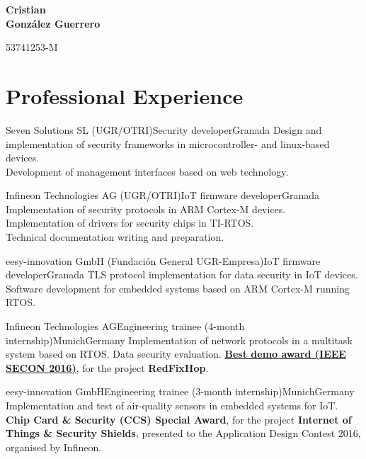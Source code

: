 \documentclass[11pt,a4paper,sans,spanish]{moderncv}
\begin{document}
\begin{minipage}[c]{\textwidth-100pt-0.5em}
    \begin{flushright}
        \textbf{\Huge{Cristian\\\vspace{4pt}González Guerrero}}

        \vspace{4pt}
        \small{53741253-M}
    \end{flushright}
\end{minipage}
\vspace{-5em}

\makecvtitle

\section{Professional Experience}

{Seven Solutions SL (UGR/OTRI)}{Security developer}{Granada}{}
{Design and implementation of security frameworks in microcontroller- and linux-based devices.\\
Development of management interfaces based on web technology.\\
}

{Infineon Technologies AG (UGR/OTRI)}{IoT firmware developer}{Granada}{}
{Implementation of security protocols in ARM Cortex-M devices.\\
Implementation of drivers for security chips in TI-RTOS.\\
Technical documentation writing and preparation.
}

{eesy-innovation GmbH (Fundación General UGR-Empresa)}{IoT firmware developer}{Granada}{}
{TLS protocol implementation for data security in IoT devices.\\
Software development for embedded systems based on ARM Cortex-M running RTOS.\\
}

{Infineon Technologies AG}{Engineering trainee (4-month internship)}{Munich}{Germany}
{
Implementation of network protocols in a multitask system based on RTOS.
Data security evaluation.
\href{http://secon2016.ieee-secon.org/content/demos-session}{\textbf{Best demo award (IEEE SECON 2016)}}, for the project \textbf{RedFixHop}.
}

{eesy-innovation GmbH}{Engineering trainee (3-month internship)}{Munich}{Germany}
{
Implementation and test of air-quality sensors in embedded systems for IoT.\\
\textbf{Chip Card \& Security (CCS) Special Award}, for the project \textbf{Internet of Things \& Security Shields}, presented to the Application Design Contest 2016, organised by Infineon.}
\end{document}
